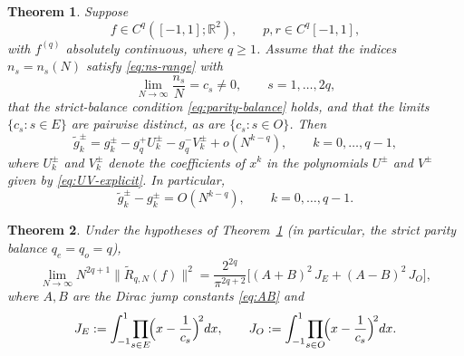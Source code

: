\documentclass[10pt,a4paper]{amsart}
\newtheorem{theorem}{Theorem}
\begin{document}
\begin{theorem}\label{thm:gjumps}
Suppose
\[
f\in C^q([-1,1];\mathbb R^2),
\qquad
p,r\in C^q[-1,1],
\]
with $f^{(q)}$ absolutely continuous, where $q\geq1$. Assume that the
indices $n_s=n_s(N)$ satisfy \eqref{eq:ns-range} with
\[
\lim_{N\to\infty}\frac{n_s}{N}=c_s\neq0,
\qquad
s=1,\dots,2q,
\]
that the strict-balance condition \eqref{eq:parity-balance} holds, and
that the limits $\{c_s:s\in E\}$ are pairwise distinct, as are
$\{c_s:s\in O\}$. Then
\begin{equation}\label{eq:tilde-g-asymp}
\widetilde g_k^\pm
=
g_k^\pm
-g_q^+U_k^\pm
-g_q^-V_k^\pm
+o(N^{k-q}),
\qquad
k=0,\dots,q-1,
\end{equation}
where $U_k^\pm$ and $V_k^\pm$ denote the coefficients of $x^k$ in
the polynomials $U^\pm$ and $V^\pm$ given by
\eqref{eq:UV-explicit}. In particular,
\[
\widetilde g_k^\pm-g_k^\pm
=
O(N^{k-q}),
\qquad
k=0,\dots,q-1.
\]
\end{theorem}

\begin{theorem}\label{thm:L2}
Under the hypotheses of Theorem~\ref{thm:gjumps} (in particular, the
strict parity balance $q_e=q_o=q$),
\begin{equation}\label{eq:L2}
\lim_{N\to\infty}N^{2q+1}\|\widetilde R_{q,N}(f)\|^2
=\frac{2^{2q}}{\pi^{2q+2}}\bigl[(A+B)^2\,J_E+(A-B)^2\,J_O\bigr],
\end{equation}
where $A,B$ are the Dirac jump constants \eqref{eq:AB} and
\begin{equation}\label{eq:JEO}
J_E:=\int_{-1}^{1}\!\prod_{s\in E}\!\Bigl(x-\frac{1}{c_s}\Bigr)^{\!2}dx,
\qquad
J_O:=\int_{-1}^{1}\!\prod_{s\in O}\!\Bigl(x-\frac{1}{c_s}\Bigr)^{\!2}dx.
\end{equation}
\end{theorem}
\end{document}
